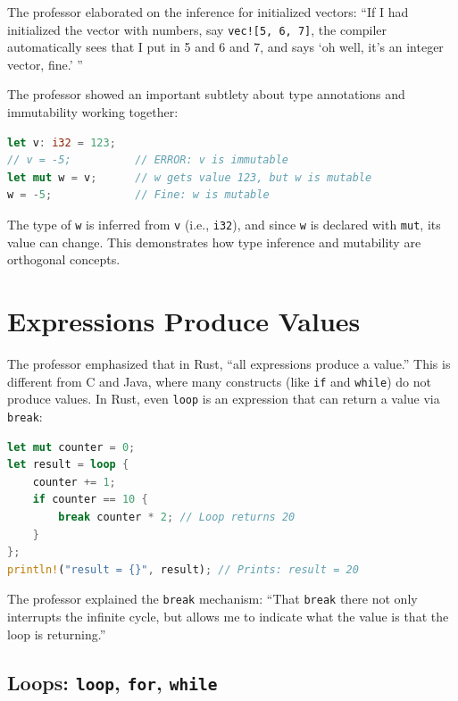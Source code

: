 The professor elaborated on the inference for initialized vectors: ``If I had initialized the vector with numbers, say \texttt{vec![5, 6, 7]}, the compiler automatically sees that I put in 5 and 6 and 7, and says `oh well, it's an integer vector, fine.' ''

\begin{insightbox}
The professor showed an important subtlety about type annotations and immutability working together:
\begin{lstlisting}[language=Rust]
let v: i32 = 123;
// v = -5;          // ERROR: v is immutable
let mut w = v;      // w gets value 123, but w is mutable
w = -5;             // Fine: w is mutable
\end{lstlisting}
The type of \texttt{w} is inferred from \texttt{v} (i.e., \texttt{i32}), and since \texttt{w} is declared with \texttt{mut}, its value can change. This demonstrates how type inference and mutability are orthogonal concepts.
\end{insightbox}

\section{Expressions Produce Values}

The professor emphasized that in Rust, ``all expressions produce a value.'' This is different from C and Java, where many constructs (like \texttt{if} and \texttt{while}) do not produce values. In Rust, even \texttt{loop} is an expression that can return a value via \texttt{break}:

\begin{lstlisting}[language=Rust]
let mut counter = 0;
let result = loop {
    counter += 1;
    if counter == 10 {
        break counter * 2; // Loop returns 20
    }
};
println!("result = {}", result); // Prints: result = 20
\end{lstlisting}

The professor explained the \texttt{break} mechanism: ``That \texttt{break} there not only interrupts the infinite cycle, but allows me to indicate what the value is that the loop is returning.''

\subsection{Loops: \texttt{loop}, \texttt{for}, \texttt{while}}

